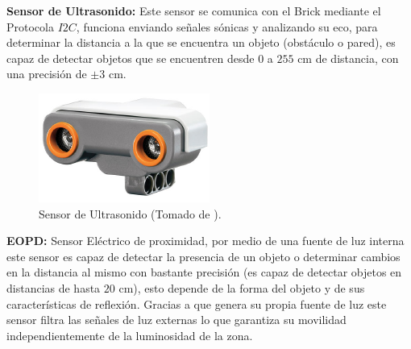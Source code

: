 \documentclass[twocolumn]{IEEEtran}
\begin{document}
\begin{enumerate}
\textbf{Sensor de Ultrasonido:} Este sensor se comunica con el Brick mediante el Protocola $I2C$, funciona enviando señales sónicas y analizando su eco, para determinar la distancia a la que se encuentra un objeto (obstáculo o pared), es capaz de detectar objetos que se encuentren desde $0$ a $255$ cm de distancia, con una precisión de $\pm 3$ cm.
\begin{figure}[H]
	\centering
		\includegraphics[scale=0.6]{sonido.png}
	\caption{Sensor de Ultrasonido (Tomado de \cite{page2}).}
	\label{fig1}
\end{figure}
\noindent
\textbf{EOPD:} Sensor Eléctrico de proximidad, por medio de una fuente de luz interna este sensor es capaz de detectar la presencia de un objeto o determinar cambios en la distancia al mismo con bastante precisión (es capaz de detectar objetos en distancias de hasta $20$ cm), esto depende de la forma del objeto y de  sus características de reflexión. Gracias  a que genera su propia fuente de luz este sensor filtra las señales de luz externas lo que garantiza su movilidad independientemente de la luminosidad de la zona.\\ 


\end{enumerate}
\end{document}

